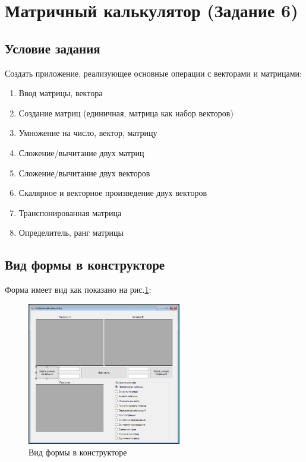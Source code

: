 \section{Матричный калькулятор (Задание 6)}

\subsection{Условие задания}

Создать приложение, реализующее основные операции с векторами и матрицами:

\begin{enumerate}
    \item{Ввод матрицы, вектора}
    \item{Создание матриц (единичная, матрица как набор векторов)}
    \item{Умножение на число, вектор, матрицу}
    \item{Сложение/вычитание двух матриц}
    \item{Сложение/вычитание двух векторов}
    \item{Скалярное и векторное произведение двух векторов}
    \item{Транспонированная матрица}
    \item{Определитель, ранг матрицы}
\end{enumerate}

\subsection{Вид формы в конструкторе}

Форма имеет вид как показано на рис.\ref{fig:FormInConstruct6}:

\begin{figure}[!h]
    \centering
    \includegraphics[width = 0.6\textwidth]{images/Task6/FormInConstructor.png}
    \caption{Вид формы в конструкторе}
    \label{fig:FormInConstruct6}
\end{figure}

